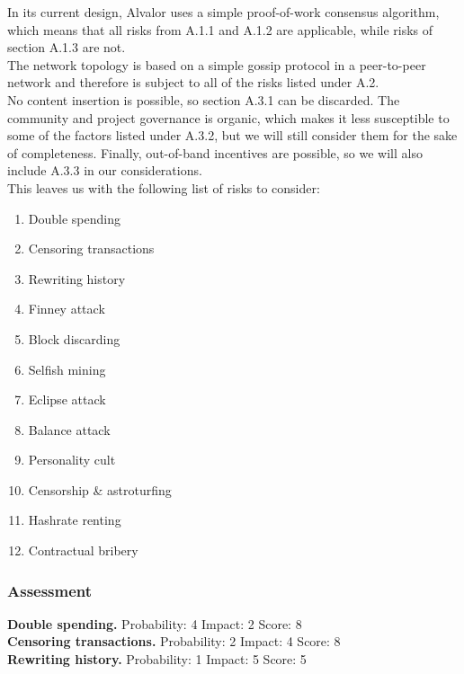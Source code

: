 \documentclass[12pt,a4paper]{article}
\begin{document}
In its current design, Alvalor uses a simple proof-of-work consensus algorithm, which means that all risks from A.1.1 and A.1.2 are applicable, while risks of section A.1.3 are not.\\

The network topology is based on a simple gossip protocol in a peer-to-peer network and therefore is subject to all of the risks listed under A.2.\\

No content insertion is possible, so section A.3.1 can be discarded. The community and project governance is organic, which makes it less susceptible to some of the factors listed under A.3.2, but we will still consider them for the sake of completeness. Finally, out-of-band incentives are possible, so we will also include A.3.3 in our considerations.\\

This leaves us with the following list of risks to consider:
\begin{enumerate}
  \item Double spending
  \item Censoring transactions
  \item Rewriting history
  \item Finney attack
  \item Block discarding
  \item Selfish mining
  \item Eclipse attack
  \item Balance attack
  \item Personality cult
  \item Censorship \& astroturfing
  \item Hashrate renting
  \item Contractual bribery
\end{enumerate}

\subsubsection{Assessment}

\textbf{Double spending.}
Probability: 4
Impact: 2
Score: 8\\

\textbf{Censoring transactions.}
Probability: 2
Impact: 4
Score: 8\\

\textbf{Rewriting history.}
Probability: 1
Impact: 5
Score: 5\\
\end{document}
